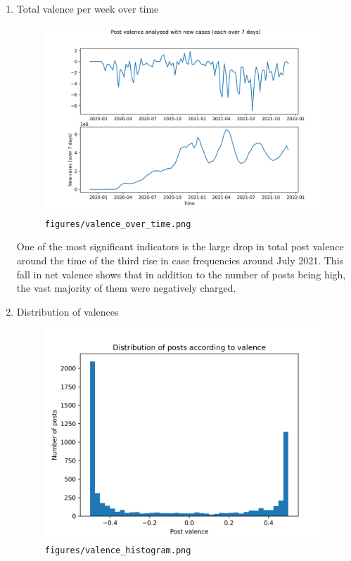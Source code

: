 \documentclass[fontsize=11pt]{article}
\begin{document}
\begin{enumerate}
    
    
    \item Total valence per week over time
    
    \begin{figure}[H]
        \centering
        \includegraphics[width=14cm]{figures/valence_over_time.png}
        \caption{\texttt{figures/valence\_over\_time.png}}
        
    \end{figure}
    
    One of the most significant indicators is the large drop in total post valence around the time of the third rise in case frequencies around July 2021. This fall in net valence shows that in addition to the number of posts being high, the vast majority of them were negatively charged.
    
    \item Distribution of valences
    
    \begin{figure}[H]
        \centering
        \includegraphics[width=14cm]{figures/valence_histogram.png}
        \caption{\texttt{figures/valence\_histogram.png}}
    \end{figure}
    

\end{enumerate}
\end{document}
